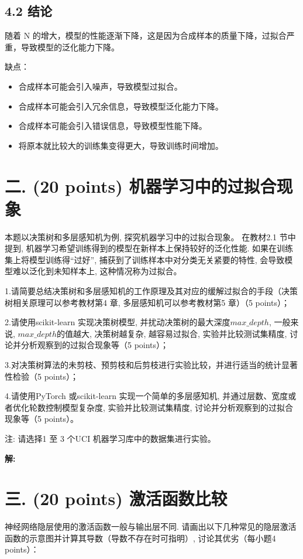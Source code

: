 \documentclass[8pt]{article}
\begin{document}
\subsection*{4.2 结论}
随着 N 的增大，模型的性能逐渐下降，这是因为合成样本的质量下降，过拟合严重，导致模型的泛化能力下降。

缺点：
    \begin{itemize}
        \item 合成样本可能会引入噪声，导致模型过拟合。
        \item 合成样本可能会引入冗余信息，导致模型泛化能力下降。
        \item 合成样本可能会引入错误信息，导致模型性能下降。
        \item 将原本就比较大的训练集变得更大，导致训练时间增加。
    \end{itemize}

\vspace{3em}

\section*{二. (20 points) 机器学习中的过拟合现象}

本题以决策树和多层感知机为例, 探究机器学习中的过拟合现象。 在教材2.1 节中提到, 机器学习希望训练得到的模型在新样本上保持较好的泛化性能. 如果在训练集上将模型训练得“过好”, 捕获到了训练样本中对分类无关紧要的特性, 会导致模型难以泛化到未知样本上, 这种情况称为过拟合。

1.请简要总结决策树和多层感知机的工作原理及其对应的缓解过拟合的手段（决策树相关原理可以参考教材第4 章, 多层感知机可以参考教材第5 章）（5 points）；

2.请使用scikit-learn 实现决策树模型, 并扰动决策树的最大深度$max\_ depth$, 一般来说, $max\_ depth$的值越大, 决策树越复杂, 越容易过拟合, 实验并比较测试集精度, 讨论并分析观察到的过拟合现象等（5 points）；

3.对决策树算法的未剪枝、预剪枝和后剪枝进行实验比较，并进行适当的统计显著性检验（5 points）；

4.请使用PyTorch 或scikit-learn 实现一个简单的多层感知机, 并通过层数、宽度或者优化轮数控制模型复杂度, 实验并比较测试集精度, 讨论并分析观察到的过拟合现象等（5 points）。

注: 请选择1 至 3 个UCI 机器学习库中的数据集进行实验。

\textbf{\large 解:}

\vspace{3em}

\section*{三. (20 points) 激活函数比较}
神经网络隐层使用的激活函数一般与输出层不同. 请画出以下几种常见的隐层激活函数的示意图并计算其导数（导数不存在时可指明）, 讨论其优劣（每小题4 points）：
\end{document}
